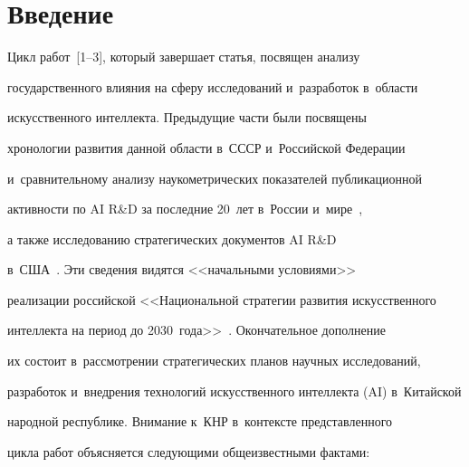 









 \thispagestyle{headings}


 


 \vspace*{-20pt}


        


\section{Введение}


     


     Цикл работ~[1--3], который завершает статья, посвящен анализу 


государственного влияния на сферу исследований и~разработок в~об\-ласти 


искусственного интеллекта. Предыдущие час\-ти были посвящены 


хронологии развития данной об\-ласти в~\mbox{СССР} и~Российской Федерации 


и~сравнительному анализу наукометрических показателей публикационной 


активности по AI R\&D за последние 20~лет в~России и~мире~\cite{1-b, 2-b}, 


а также исследованию стратегических документов AI R\&D  


в~США~\cite{3-b}. Эти сведения видятся <<начальными условиями>> 


реализации российской <<Национальной стратегии развития искусственного 


интеллекта на период до 2030~года>>~\cite{4-b}. Окончательное дополнение 


их со\-сто\-ит в~рас\-смот\-ре\-нии стратегических планов научных исследований, 


разработок и~внед\-ре\-ния технологий искусственного интеллекта (AI) в~Китайской 


народной республике. Внимание к~КНР в~контексте представленного 


цикла работ объясняется сле\-ду\-ющи\-ми общеизвестными фактами:


